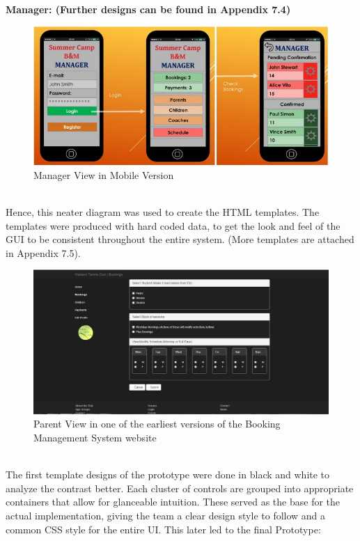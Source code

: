 \documentclass{l3proj}
\begin{document}
\\ \textbf{Manager: (Further designs can be found in Appendix 7.4)}
{
\begin{figure}[h]
\caption{Manager View in Mobile Version}
\centering
\includegraphics[scale=0.65]{diagramdraft2Manager.jpg}
\end{figure}
}
\\
Hence, this neater diagram was used to create the HTML templates. The templates were produced with hard coded data, to get the look and feel of the GUI to be consistent throughout the entire system. (More templates are attached in Appendix 7.5).
{
\begin{figure}[h!]
\caption{Parent View in one of the earliest versions of the Booking Management System website}
\centering
\includegraphics[scale=0.35]{parent_template.jpg}
\end{figure}
}
\\The first template designs of the prototype were done in black and white to analyze the contrast better. Each cluster of controls are grouped into appropriate containers that allow for glanceable intuition. These served as the base for the actual implementation, giving the team a clear design style to follow and a common CSS style for the entire UI. This later led to the final Prototype:
\end{document}
